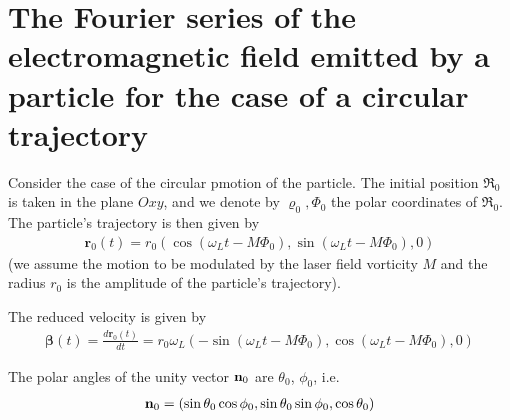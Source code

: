 \chapter{The Fourier series of the electromagnetic field emitted by a particle for the case of a circular trajectory}

Consider the case of the circular pmotion of the particle. The initial position $\mathfrak{R}_0$ is taken in the plane $Oxy$, and we denote by $\varrho_0, \varPhi_0$ the polar coordinates of $\mathfrak{R}_0$. The particle's trajectory is then given by
\begin{align}
    \mathbf{r}_0(t) = r_0 \left(\cos(\omega_L t - M\varPhi_0), \sin(\omega_L t - M\varPhi_0), 0\right)
\end{align}
(we assume the motion to be modulated by the laser field vorticity $M$ and the radius $r_0$ is the amplitude of the particle's trajectory).

The reduced velocity is given by
\begin{align}
    {\pmb\beta}(t) = \frac{d\mathbf{r}_0(t)}{dt} = r_0 \omega_L \left(-\sin(\omega_L t - M\varPhi_0), \cos(\omega_L t - M\varPhi_0), 0\right)
\end{align}

The polar angles of the unity vector ${\bf n}_0$ are $\theta_0$, $\phi_0$, i.e.
\begin{align}
    {\bf n}_0 = (\sin\theta_0\cos\phi_0, \sin\theta_0\sin\phi_0, \cos\theta_0)
\end{align}